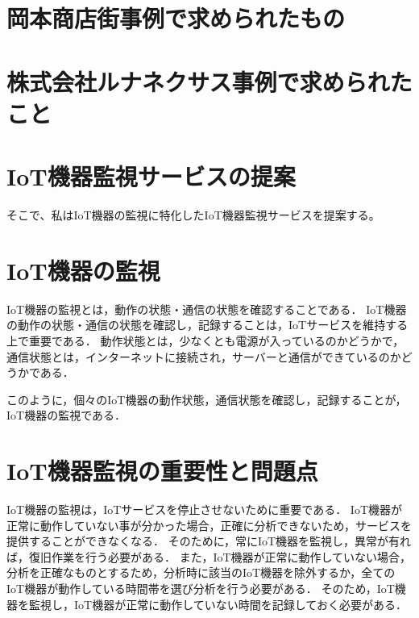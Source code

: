 \section{岡本商店街事例で求められたもの}

\section{株式会社ルナネクサス事例で求められたこと}

\section{IoT機器監視サービスの提案}
そこで、私はIoT機器の監視に特化したIoT機器監視サービスを提案する。






\section{IoT機器の監視}%

IoT機器の監視とは，動作の状態・通信の状態を確認することである．
IoT機器の動作の状態・通信の状態を確認し，記録することは，IoTサービスを維持する上で重要である．
動作状態とは，少なくとも電源が入っているのかどうかで，通信状態とは，インターネットに接続され，サーバーと通信ができているのかどうかである．
\medskip

このように，個々のIoT機器の動作状態，通信状態を確認し，記録することが，IoT機器の監視である．

\section{IoT機器監視の重要性と問題点}
IoT機器の監視は，IoTサービスを停止させないために重要である．
IoT機器が正常に動作していない事が分かった場合，正確に分析できないため，サービスを提供することができなくなる．
そのために，常にIoT機器を監視し，異常が有れば，復旧作業を行う必要がある．
また，IoT機器が正常に動作していない場合，分析を正確なものとするため，分析時に該当のIoT機器を除外するか，全てのIoT機器が動作している時間帯を選び分析を行う必要がある．
そのため，IoT機器を監視し，IoT機器が正常に動作していない時間を記録しておく必要がある．
\medskip

